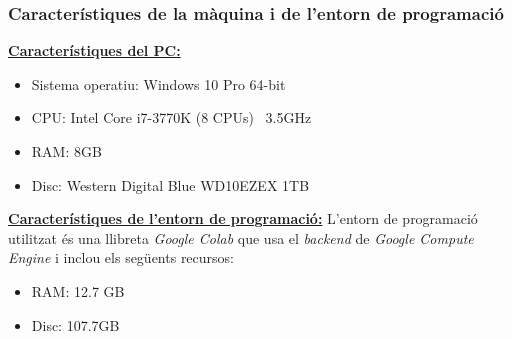 \documentclass[a4paper,12pt]{article}
\begin{document}
\subsubsection*{Característiques de la màquina i de l'entorn de programació}
\textbf{\underline{Característiques del PC:}}
\begin{itemize}
    \item Sistema operatiu: Windows 10 Pro 64-bit
    \item CPU: Intel Core i7-3770K (8 CPUs) ~3.5GHz
    \item RAM: 8GB
    \item Disc: Western Digital Blue WD10EZEX 1TB
\end{itemize}
\textbf{\underline{Característiques de l'entorn de programació:}}
L'entorn de programació utilitzat és una llibreta \textit{Google Colab} que usa el \textit{backend} de \textit{Google Compute Engine} i inclou els següents recursos:
\begin{itemize}
    \item RAM: 12.7 GB
    \item Disc: 107.7GB
\end{itemize}
\end{document}
